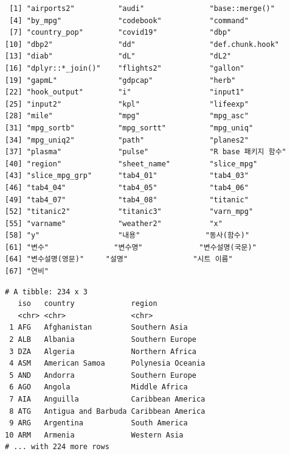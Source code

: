 \documentclass[
  11pt,
]{krantz}
\newenvironment{Shaded}{\begin{snugshade}}{\end{snugshade}}
\newcommand{\NormalTok}[1]{#1}
\newcommand{\OperatorTok}[1]{\textcolor[rgb]{0.43,0.43,0.43}{\textbf{#1}}}
\newcommand{\StringTok}[1]{\textcolor[rgb]{0.5,0.5,0.5}{#1}}
\begin{document}
\begin{verbatim}
 [1] "airports2"          "audi"               "base::merge()"     
 [4] "by_mpg"             "codebook"           "command"           
 [7] "country_pop"        "covid19"            "dbp"               
[10] "dbp2"               "dd"                 "def.chunk.hook"    
[13] "diab"               "dL"                 "dL2"               
[16] "dplyr::*_join()"    "flights2"           "gallon"            
[19] "gapmL"              "gdpcap"             "herb"              
[22] "hook_output"        "i"                  "input1"            
[25] "input2"             "kpl"                "lifeexp"           
[28] "mile"               "mpg"                "mpg_asc"           
[31] "mpg_sortb"          "mpg_sortt"          "mpg_uniq"          
[34] "mpg_uniq2"          "path"               "planes2"           
[37] "plasma"             "pulse"              "R base 패키지 함수"
[40] "region"             "sheet_name"         "slice_mpg"         
[43] "slice_mpg_grp"      "tab4_01"            "tab4_03"           
[46] "tab4_04"            "tab4_05"            "tab4_06"           
[49] "tab4_07"            "tab4_08"            "titanic"           
[52] "titanic2"           "titanic3"           "varn_mpg"          
[55] "varname"            "weather2"           "x"                 
[58] "y"                  "내용"               "동사(함수)"        
[61] "변수"               "변수명"             "변수설명(국문)"    
[64] "변수설명(영문)"     "설명"               "시트 이름"         
[67] "연비"              
\end{verbatim}

\begin{Shaded}
\end{Shaded}

\begin{verbatim}
# A tibble: 234 x 3
   iso   country             region           
   <chr> <chr>               <chr>            
 1 AFG   Afghanistan         Southern Asia    
 2 ALB   Albania             Southern Europe  
 3 DZA   Algeria             Northern Africa  
 4 ASM   American Samoa      Polynesia Oceania
 5 AND   Andorra             Southern Europe  
 6 AGO   Angola              Middle Africa    
 7 AIA   Anguilla            Caribbean America
 8 ATG   Antigua and Barbuda Caribbean America
 9 ARG   Argentina           South America    
10 ARM   Armenia             Western Asia     
# ... with 224 more rows
\end{verbatim}
\end{document}
